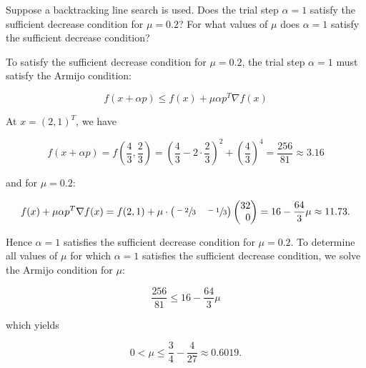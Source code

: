 Suppose a backtracking line search is used. Does the trial step $\alpha = 1$ satisfy the sufficient decrease condition 
for $\mu = 0.2$? For what values of $\mu$ does $\alpha = 1$ satisfy the sufficient decrease condition?

\begin{solution}
    To satisfy the sufficient decrease condition for $\mu = 0.2$, the trial step $\alpha = 1$ must satisfy the Armijo 
    condition:

    $$
    f(x + \alpha p) \le f(x) + \mu \alpha p^T \nabla f(x)
    $$

    At $x = (2, 1)^T$, we have 

    $$
    f(x + \alpha p) = f \left(\frac{4}{3}, \frac{2}{3} \right) = \left(\frac{4}{3} - 2 \cdot \frac{2}{3} \right)^2 + \left( \frac{4}{3} \right)^4 = \frac{256}{81} \approx 3.16
    $$

    and for $\mu = 0.2$:
    
    $$
    f(x) + \mu \alpha p^T \nabla f(x) = f(2, 1) + \mu \cdot \begin{pmatrix*}[r] \sfrac{-2}{3} & \sfrac{-1}{3} \end{pmatrix*} \begin{pmatrix*}[r] 32 \\ 0 \end{pmatrix*} = 16 - \frac{64}{3} \mu \approx 11.73.
    $$

    Hence $\alpha = 1$ satisfies the sufficient decrease condition for $\mu = 0.2$. To determine all values of $\mu$ for
    which $\alpha = 1$ satisfies the sufficient decrease condition, we solve the Armijo condition for $\mu$:

    $$
    \frac{256}{81} \le 16 - \frac{64}{3} \mu
    $$

    which yields

    $$
    0 < \mu \le \frac{3}{4} - \frac{4}{27} \approx 0.6019.
    $$
    \ \\
\end{solution}
